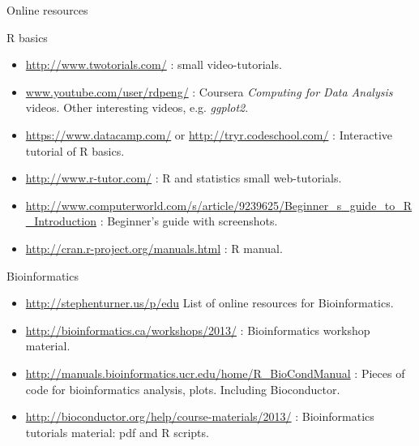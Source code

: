 \documentclass[10pt]{beamer}
\begin{document}
\begin{frame}[shrink=15]{Online resources}
  \begin{block}{R basics}
    \begin{itemize}
    \item \url{http://www.twotorials.com/} : small video-tutorials.
    \item \url{www.youtube.com/user/rdpeng/} : Coursera {\it Computing for Data Analysis} videos. Other interesting videos, e.g. {\it ggplot2}.
      \bigskip
    \item \url{https://www.datacamp.com/} or \url{http://tryr.codeschool.com/} : Interactive tutorial of R basics.
      \bigskip
    \item \url{http://www.r-tutor.com/} : R and statistics small web-tutorials.
    \item \url{http://www.computerworld.com/s/article/9239625/Beginner_s_guide_to_R_Introduction} : Beginner's guide with screenshots.      
    \item \url{http://cran.r-project.org/manuals.html} : R manual.
    \end{itemize}
  \end{block}
  
  \begin{block}{Bioinformatics}
    \begin{itemize}
    \item \url{http://stephenturner.us/p/edu} List of online resources for Bioinformatics.
    \item \url{http://bioinformatics.ca/workshops/2013/} : Bioinformatics workshop material.
    \item \url{http://manuals.bioinformatics.ucr.edu/home/R_BioCondManual} : Pieces of code for bioinformatics analysis, plots. Including Bioconductor.
    \item \url{http://bioconductor.org/help/course-materials/2013/} : Bioinformatics tutorials material: pdf and R scripts.
    \end{itemize}
  \end{block}


\end{frame}


\end{document}
